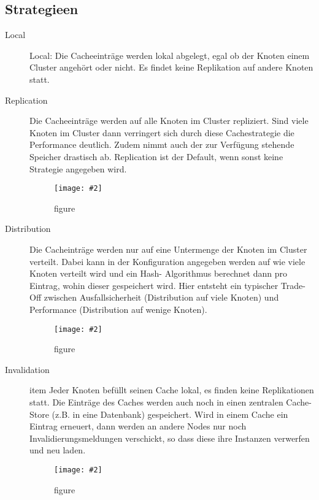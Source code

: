 \documentclass[a4paper,10pt]{scrreprt}
\newcommand{\pic}[2][figure]{\begin{figure}[h]
 \centering
 \texttt{[image: \#2]}
 \caption{#1}
\end{figure}
}
\begin{document}
\subsection{Strategieen} %
\label{sub:strategieen}
\begin{description}
	\item[Local]  Local: Die Cacheeinträge werden lokal abgelegt, egal ob der Knoten einem Cluster angehört oder nicht.
Es findet keine Replikation auf andere Knoten statt.
\item[Replication]  Die Cacheeinträge werden auf alle Knoten im Cluster repliziert. Sind viele Knoten im Cluster
dann verringert sich durch diese Cachestrategie die Performance deutlich. Zudem nimmt auch der zur
Verfügung stehende Speicher drastisch ab. Replication ist der Default, wenn sonst keine Strategie
angegeben wird.
\pic{crep.png}
\item[Distribution] Die Cacheinträge werden nur auf eine Untermenge der Knoten im Cluster verteilt. Dabei
kann in der Konfiguration angegeben werden auf wie viele Knoten verteilt wird und ein Hash-
Algorithmus berechnet dann pro Eintrag, wohin dieser gespeichert wird. Hier entsteht ein typischer
Trade-Off zwischen Ausfallsicherheit (Distribution auf viele Knoten) und Performance (Distribution auf
wenige Knoten).
\pic{cdist.png}
\item[Invalidation] item Jeder Knoten befüllt seinen Cache lokal, es finden keine Replikationen statt. Die Einträge
des Caches werden auch noch in einen zentralen Cache-Store (z.B. in eine Datenbank) gespeichert. Wird
in einem Cache ein Eintrag erneuert, dann werden an andere Nodes nur noch Invalidierungsmeldungen
verschickt, so dass diese ihre Instanzen verwerfen und neu laden.
\pic{cinv.png}
\end{description}
\end{document}
